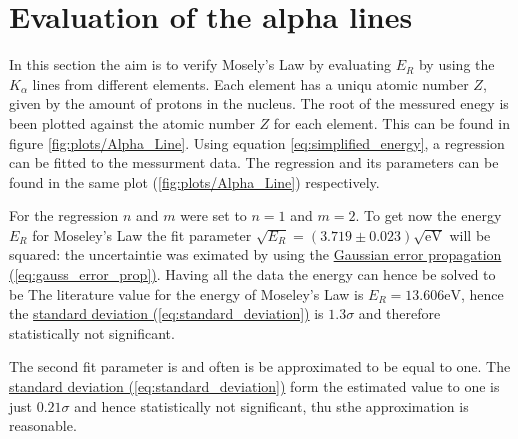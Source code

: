 \newpage




\section{Evaluation of the alpha lines}
\label{sec:A1}
In this section the aim is to verify Mosely's Law by evaluating $E_R$ by using the $K_\alpha$ lines from different elements. Each element has a uniqu atomic number $Z$, given by the amount of protons in the nucleus. The root of the messured enegy is been plotted against the atomic number $Z$ for each element. This can be found in figure \ref{fig:plots/Alpha_Line}. Using equation \ref{eq:simplified_energy}, a regression can be fitted to the messurment data. The regression and its parameters can be found in the same plot (\ref{fig:plots/Alpha_Line}) respectively.

For the regression $n$ and $m$ were set to $n=1$ and $m =2$. To get now the energy $E_R$ for Moseley's Law the fit parameter $\sqrt{E_R} = (3.719 \pm 0.023)\mathrm{\sqrt{eV}}$ will be squared:
the uncertaintie was eximated by using the \hyperref[eq:gauss_error_prop]{Gaussian error propagation (\ref*{eq:gauss_error_prop})}. Having all the data the energy can hence be solved to be
The literature value for the energy of Moseley's Law is $E_R = 13.606 \mathrm{eV}$, hence the \hyperref[eq:standard_deviation]{standard deviation (\ref*{eq:standard_deviation})} is $1.3\sigma$ and therefore statistically not significant.

The second fit parameter is 
and often is be approximated to be equal to one. The \hyperref[eq:standard_deviation]{standard deviation (\ref*{eq:standard_deviation})} form the estimated value to one is just $0.21\sigma$ and hence statistically not significant, thu sthe approximation is reasonable.

